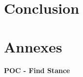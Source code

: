 \documentclass[a4paper,12pt]{article}
\begin{document}
\newpage

\part{Conclusion}
	
	\newpage




\newpage
\part{Annexes}
	\subsection{POC - Find Stance}
	\label{annexe-stance-detection}	%
	
\end{document}
